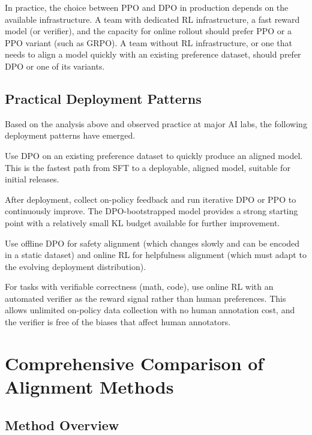 In practice, the choice between PPO and DPO in production depends on the available infrastructure. A team with dedicated RL infrastructure, a fast reward model (or verifier), and the capacity for online rollout should prefer PPO or a PPO variant (such as GRPO). A team without RL infrastructure, or one that needs to align a model quickly with an existing preference dataset, should prefer DPO or one of its variants.

\subsection{Practical Deployment Patterns}

Based on the analysis above and observed practice at major AI labs, the following deployment patterns have emerged.

\begin{description}[leftmargin=!,labelwidth=3.5cm]
  \item[Bootstrap with DPO] Use DPO on an existing preference dataset to quickly produce an aligned model. This is the fastest path from SFT to a deployable, aligned model, suitable for initial releases.
  \item[Refine with online RL] After deployment, collect on-policy feedback and run iterative DPO or PPO to continuously improve. The DPO-bootstrapped model provides a strong starting point with a relatively small KL budget available for further improvement.
  \item[Capability-safety separation] Use offline DPO for safety alignment (which changes slowly and can be encoded in a static dataset) and online RL for helpfulness alignment (which must adapt to the evolving deployment distribution).
  \item[Verifier-guided RL for reasoning] For tasks with verifiable correctness (math, code), use online RL with an automated verifier as the reward signal rather than human preferences. This allows unlimited on-policy data collection with no human annotation cost, and the verifier is free of the biases that affect human annotators.
\end{description}

\section{Comprehensive Comparison of Alignment Methods}
\label{sec:alignment-comparison}

\subsection{Method Overview}

